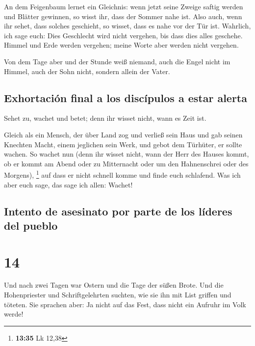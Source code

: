  An dem Feigenbaum lernet ein Gleichnis: wenn jetzt seine
Zweige saftig werden und Blätter gewinnen, so wisst ihr, dass der Sommer
nahe ist.  Also auch, wenn ihr sehet, dass solches
geschieht, so wisset, dass es nahe vor der Tür ist. 
Wahrlich, ich sage euch: Dies Geschlecht wird nicht vergehen, bis dass
dies alles geschehe.  Himmel und Erde werden vergehen;
meine Worte aber werden nicht vergehen.

 Von dem Tage aber und der Stunde weiß niemand, auch die
Engel nicht im Himmel, auch der Sohn nicht, sondern allein der Vater.

\hypertarget{exhortaciuxf3n-final-a-los-discuxedpulos-a-estar-alerta}{%
\subsection{Exhortación final a los discípulos a estar
alerta}\label{exhortaciuxf3n-final-a-los-discuxedpulos-a-estar-alerta}}

 Sehet zu, wachet und betet; denn ihr wisset nicht, wann
es Zeit ist.

 Gleich als ein Mensch, der über Land zog und verließ
sein Haus und gab seinen Knechten Macht, einem jeglichen sein Werk, und
gebot dem Türhüter, er sollte wachen.  So wachet nun
(denn ihr wisset nicht, wann der Herr des Hauses kommt, ob er kommt am
Abend oder zu Mitternacht oder um den Hahnenschrei oder des Morgens),
\footnote{\textbf{13:35} Lk 12,38}  auf dass er nicht
schnell komme und finde euch schlafend.  Was ich aber
euch sage, das sage ich allen: Wachet!

\hypertarget{intento-de-asesinato-por-parte-de-los-luxedderes-del-pueblo}{%
\subsection{Intento de asesinato por parte de los líderes del
pueblo}\label{intento-de-asesinato-por-parte-de-los-luxedderes-del-pueblo}}

\hypertarget{section-13}{%
\section{14}\label{section-13}}

 Und nach zwei Tagen war Ostern und die Tage der süßen
Brote. Und die Hohenpriester und Schriftgelehrten suchten, wie sie ihn
mit List griffen und töteten.  Sie sprachen aber: Ja nicht
auf das Fest, dass nicht ein Aufruhr im Volk werde!

